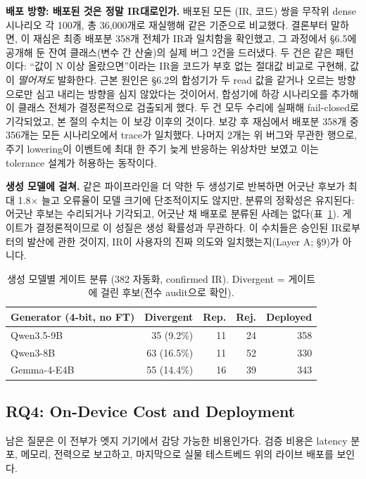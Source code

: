 \documentclass[sigconf,nonacm,anonymous,review]{acmart}
\begin{document}
\textbf{배포 방향: 배포된 것은 정말 IR대로인가.} 배포된 모든 (IR, 코드) 쌍을 무작위 dense 시나리오 각 100개, 총 36,000개로 재실행해 같은 기준으로 비교했다. 결론부터 말하면, 이 재심은 최종 배포분 358개 전체가 IR과 일치함을 확인했고, 그 과정에서 \S6.5에 공개해 둔 잔여 클래스(변수 간 산술)의 실제 버그 2건을 드러냈다. 두 건은 같은 패턴이다: ``값이 N 이상 올랐으면''이라는 IR을 코드가 부호 없는 절대값 비교로 구현해, 값이 \emph{떨어져도} 발화한다. 근본 원인은 \S6.2의 합성기가 두 read 값을 같거나 오르는 방향으로만 심고 내리는 방향을 심지 않았다는 것이어서, 합성기에 하강 시나리오를 추가해 이 클래스 전체가 결정론적으로 검출되게 했다. 두 건 모두 수리에 실패해 fail-closed로 기각되었고, 본 절의 수치는 이 보강 이후의 것이다. 보강 후 재심에서 배포분 358개 중 356개는 모든 시나리오에서 trace가 일치했다. 나머지 2개는 위 버그와 무관한 행으로, 주기 lowering이 이벤트에 최대 한 주기 늦게 반응하는 위상차만 보였고 이는 tolerance 설계가 허용하는 동작이다.

\textbf{생성 모델에 걸쳐.} 같은 파이프라인을 더 약한 두 생성기로 반복하면 어긋난 후보가 최대 1.8$\times$ 늘고 오류율이 모델 크기에 단조적이지도 않지만, 분류의 정확성은 유지된다: 어긋난 후보는 수리되거나 기각되고, 어긋난 채 배포로 분류된 사례는 없다(표~\ref{tab:models}). 게이트가 결정론적이므로 이 성질은 생성 확률성과 무관하다. 이 수치들은 승인된 IR로부터의 발산에 관한 것이지, IR이 사용자의 진짜 의도와 일치했는지(Layer A; \S9)가 아니다.

\begin{table}[t]
\centering
\caption{생성 모델별 게이트 분류 (382 자동화, confirmed IR). Divergent = 게이트에 걸린 후보(전수 audit으로 확인).}
\label{tab:models}
\small
\setlength{\tabcolsep}{4pt}
\begin{tabular}{lrrrr}
\toprule
Generator (4-bit, no FT) & Divergent & Rep. & Rej. & Deployed \\
\midrule
Qwen3.5-9B  & 35 (9.2\%)  & 11 & 24 & 358 \\
Qwen3-8B    & 63 (16.5\%) & 11 & 52 & 330 \\
Gemma-4-E4B & 55 (14.4\%) & 16 & 39 & 343 \\
\bottomrule
\end{tabular}
\end{table}

\subsection{RQ4: On-Device Cost and Deployment}

남은 질문은 이 전부가 엣지 기기에서 감당 가능한 비용인가다. 검증 비용은 latency 분포, 메모리, 전력으로 보고하고, 마지막으로 실물 테스트베드 위의 라이브 배포를 보인다.
\end{document}
